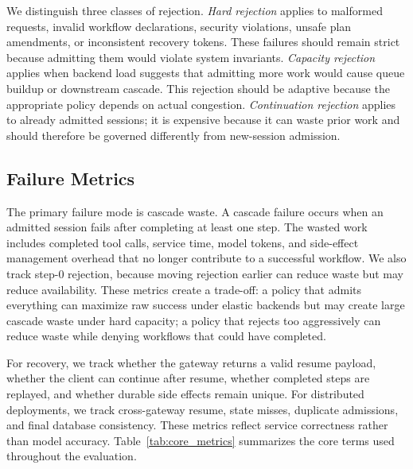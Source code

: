 \documentclass[5p,times]{elsarticle}
\begin{document}
We distinguish three classes of rejection. \emph{Hard rejection} applies to malformed requests, invalid workflow declarations, security violations, unsafe plan amendments, or inconsistent recovery tokens. These failures should remain strict because admitting them would violate system invariants. \emph{Capacity rejection} applies when backend load suggests that admitting more work would cause queue buildup or downstream cascade. This rejection should be adaptive because the appropriate policy depends on actual congestion. \emph{Continuation rejection} applies to already admitted sessions; it is expensive because it can waste prior work and should therefore be governed differently from new-session admission.

\subsection{Failure Metrics}

The primary failure mode is cascade waste. A cascade failure occurs when an admitted session fails after completing at least one step. The wasted work includes completed tool calls, service time, model tokens, and side-effect management overhead that no longer contribute to a successful workflow. We also track step-0 rejection, because moving rejection earlier can reduce waste but may reduce availability. These metrics create a trade-off: a policy that admits everything can maximize raw success under elastic backends but may create large cascade waste under hard capacity; a policy that rejects too aggressively can reduce waste while denying workflows that could have completed.

For recovery, we track whether the gateway returns a valid resume payload, whether the client can continue after resume, whether completed steps are replayed, and whether durable side effects remain unique. For distributed deployments, we track cross-gateway resume, state misses, duplicate admissions, and final database consistency. These metrics reflect service correctness rather than model accuracy. Table~\ref{tab:core_metrics} summarizes the core terms used throughout the evaluation.
\end{document}
